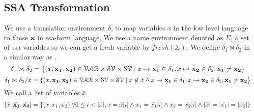 \documentclass[a4paper,11pt]{article}
\begin{document}
\subsection{SSA Transformation}
We use a translation environment $\delta$, to map variables $x$ in the low level language to those $\mathbf{{x}}$ in ssa-form language. We use a name environment denoted as $\Sigma$, a set of ssa variables so we can get a fresh variable by $fresh(\Sigma)$. We define $\delta_1 \bowtie \delta_2 $ in a similar way as
\cite{vekris2016refinement}.
\[ \delta_1 \bowtie \delta_2 = \{ ( x, {\mathbf{{x_1}}, \mathbf{{x_2}}} ) \in \mathcal{VAR} \times \mathcal{SV} \times \mathcal{SV} \mid x \mapsto {\mathbf{{x_1}}} \in \delta_1 , x \mapsto {\mathbf{{x_2}} } \in \delta_2, {\mathbf{{x_1}} \not= {\mathbf{{x_2}} }  }  \} \]
\[ \delta_1 \bowtie \delta_2 / \bar{x} = \{ ( x, {\mathbf{{x_1}}, \mathbf{{x_2}}} ) \in \mathcal{VAR} \times \mathcal{SV} \times \mathcal{SV} \mid x \not\in \bar{x} \land x \mapsto {\mathbf{{x_1}}} \in \delta_1 , x \mapsto {\mathbf{{x_2}} } \in \delta_2, {\mathbf{{x_1}} \not= {\mathbf{{x_2}} }   }  \} \]
We call a list of variables $\bar{x}$.
\[
 [\bar{x}, \bar{\mathbf{{x_1}}}, \bar{\mathbf{{x_2}}}] = \{ (x, x_1,x_2)  | \forall 0 \leq i < |\bar{x}|, x = \bar{x }[i] \land x_1 = \bar{x_1}[i] \land x_2 = \bar{x_2 }[i] \land |\bar{x}| = |\bar{x_1}| = |\bar{x_2}|   \}
\]
\end{document}
